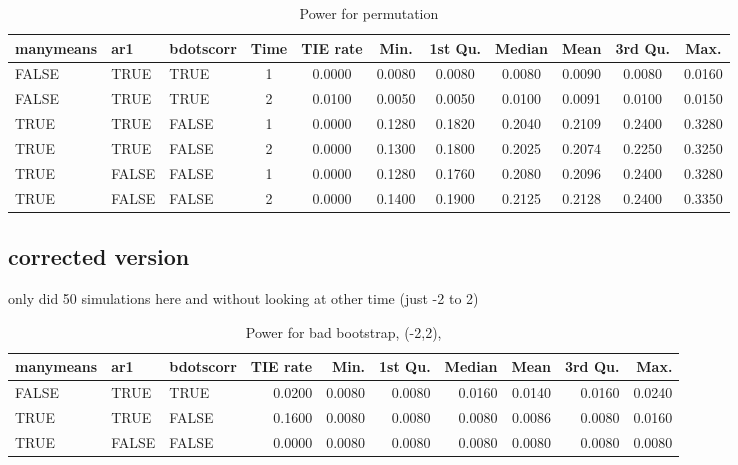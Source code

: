 \documentclass{article}
\begin{document}
\begin{table}[H]
\centering
\begin{tabular}{lllcccccccc}
  \hline
manymeans & ar1 & bdotscorr & Time & TIE rate & Min. & 1st Qu. & Median & Mean & 3rd Qu. & Max. \\ 
  \hline
FALSE & TRUE & TRUE &     1 & 0.0000 & 0.0080 & 0.0080 & 0.0080 & 0.0090 & 0.0080 & 0.0160 \\ 
  FALSE & TRUE & TRUE &     2 & 0.0100 & 0.0050 & 0.0050 & 0.0100 & 0.0091 & 0.0100 & 0.0150 \\ 
  TRUE & TRUE & FALSE &     1 & 0.0000 & 0.1280 & 0.1820 & 0.2040 & 0.2109 & 0.2400 & 0.3280 \\ 
  TRUE & TRUE & FALSE &     2 & 0.0000 & 0.1300 & 0.1800 & 0.2025 & 0.2074 & 0.2250 & 0.3250 \\ 
  TRUE & FALSE & FALSE &     1 & 0.0000 & 0.1280 & 0.1760 & 0.2080 & 0.2096 & 0.2400 & 0.3280 \\ 
  TRUE & FALSE & FALSE &     2 & 0.0000 & 0.1400 & 0.1900 & 0.2125 & 0.2128 & 0.2400 & 0.3350 \\ 
   \hline
\end{tabular}
\caption{Power for permutation} 
\label{tab:perm_pwr}
\end{table}

\subsection{corrected version}

only did 50 simulations here and without looking at other time (just -2 to 2)


\begin{table}[H]
\centering
\begin{tabular}{lllrrrrrrr}
  \hline
manymeans & ar1 & bdotscorr & TIE rate & Min. & 1st Qu. & Median & Mean & 3rd Qu. & Max. \\ 
  \hline
FALSE & TRUE & TRUE & 0.0200 & 0.0080 & 0.0080 & 0.0160 & 0.0140 & 0.0160 & 0.0240 \\ 
  TRUE & TRUE & FALSE & 0.1600 & 0.0080 & 0.0080 & 0.0080 & 0.0086 & 0.0080 & 0.0160 \\ 
  TRUE & FALSE & FALSE & 0.0000 & 0.0080 & 0.0080 & 0.0080 & 0.0080 & 0.0080 & 0.0080 \\ 
   \hline
\end{tabular}
\caption{Power for bad bootstrap, (-2,2), } 
\label{tab:bad_boot_pwr2}
\end{table}
\end{document}
